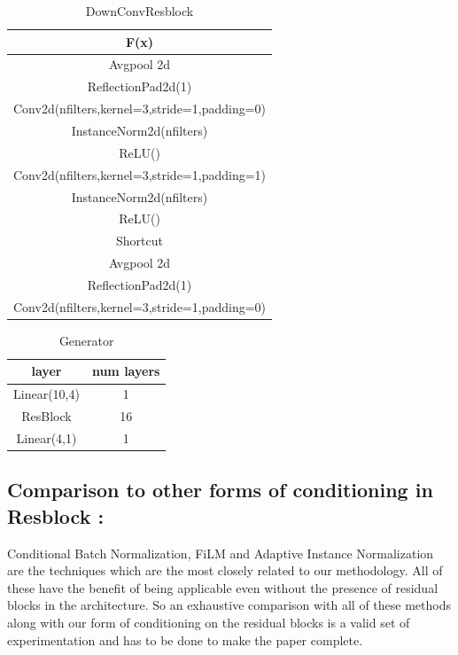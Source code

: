 \begin{table}[ht]
\caption{DownConvResblock} %
\centering %
\begin{tabular}{c} %
\hline\hline %
F(x)\\%
\hline
Avgpool 2d \\
ReflectionPad2d(1) \\
Conv2d(nfilters,kernel=3,stride=1,padding=0) \\
InstanceNorm2d(nfilters)\\ %
ReLU() \\
Conv2d(nfilters,kernel=3,stride=1,padding=1) \\
InstanceNorm2d(nfilters)\\ %
ReLU() \\
\hline %
Shortcut\\
\hline 
Avgpool 2d \\
ReflectionPad2d(1)\\
Conv2d(nfilters,kernel=3,stride=1,padding=0) \\
\hline
\end{tabular}
\label{table:downconvresblock} %
\end{table}


\begin{table}[ht]
\caption{Generator} %
\centering %
\begin{tabular}{c c} %
\hline\hline %
layer & num layers\\%
\hline %
Linear(10,4) & 1\\ %
ResBlock & 16 \\
Linear(4,1) & 1 \\
\hline %
\end{tabular}
\label{table:1d_G} %
\end{table}


\subsection{Comparison to other forms of conditioning in Resblock :}
Conditional Batch Normalization, FiLM and Adaptive Instance Normalization are the techniques which are the most closely related to our methodology. All of these have the benefit of being applicable even without the presence of residual blocks in the architecture. So an exhaustive comparison with all of these methods along with our form of conditioning on the residual blocks is a valid set of experimentation and has to be done to make the paper complete.

